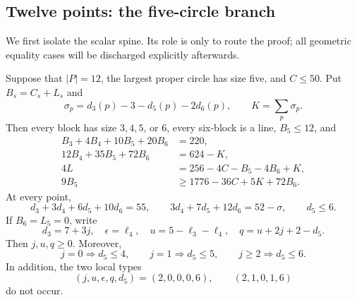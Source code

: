 \subsection{Twelve points: the five-circle branch}

We first isolate the scalar spine.  Its role is only to route the proof;
all geometric equality cases will be discharged explicitly afterwards.

\begin{lemma}\label{lem:n12-g5-spine}
Suppose that $|P|=12$, the largest proper circle has size five, and
$C\le50$.  Put $B_s=C_s+L_s$ and
\[
 \sigma_p=d_3(p)-3-d_5(p)-2d_6(p),\qquad
 K=\sum_p\sigma_p.
\]
Then every block has size $3,4,5$, or $6$, every six-block is a line,
$B_5\le12$, and
\begin{align}
B_3+4B_4+10B_5+20B_6&=220,\label{eq:n12-g5-triples}\\
12B_4+35B_5+72B_6&=624-K,\label{eq:n12-g5-block}\\
4L&=256-4C-B_5-4B_6+K,\label{eq:n12-g5-lines}\\
9B_5&\ge1776-36C+5K+72B_6.\label{eq:n12-g5-added}
\end{align}
At every point,
\begin{equation}\label{eq:n12-g5-local}
d_3+3d_4+6d_5+10d_6=55,\qquad
3d_4+7d_5+12d_6=52-\sigma,\qquad d_5\le6.
\end{equation}
If $B_6=L_5=0$, write
\begin{equation}\label{eq:n12-q-definition}
d_3=7+3j,\quad \epsilon=\ell_4,\quad
u=5-\ell_3-\ell_4,\quad q=u+2j+2-d_5.
\end{equation}
Then $j,u,q\ge0$.  Moreover,
\begin{equation}\label{eq:n12-d5-caps}
j=0\Longrightarrow d_5\le4,\qquad
j=1\Longrightarrow d_5\le5,\qquad
j\ge2\Longrightarrow d_5\le6.
\end{equation}
In addition, the two local types
\begin{equation}\label{eq:n12-grid-forbidden-types}
(j,u,\epsilon,q,d_5)=(2,0,0,0,6),\qquad(2,1,0,1,6)
\end{equation}
do not occur.
\end{lemma}

